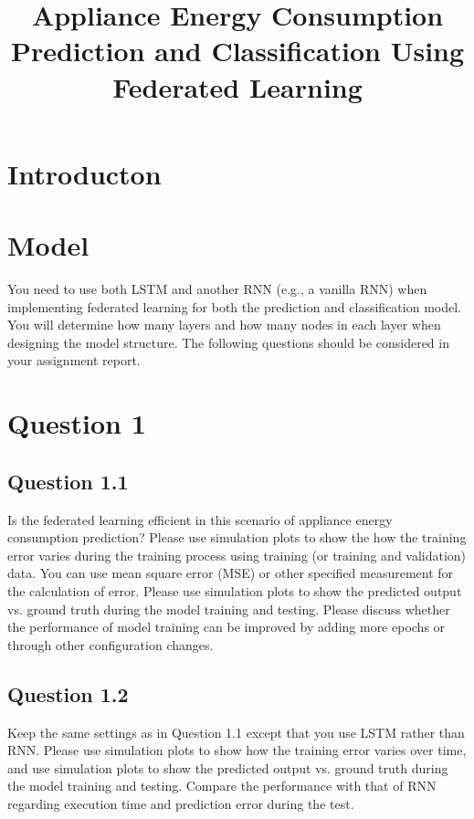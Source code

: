 \documentclass[a4paper, article, oneside, USenglish, IN5460]{memoir}
\title{Appliance Energy Consumption Prediction and Classification Using Federated Learning}
\begin{document}
\projectfrontpage


\chapter{Introducton}


\chapter{Model}

You need to use both LSTM and another RNN (e.g., a vanilla RNN) when implementing federated learning for both the prediction and classification model. You will determine how many layers and how many nodes in each layer when designing the model structure. The following questions should be considered in your assignment report.

\chapter{Question 1}



\section{Question 1.1}

Is the federated learning efficient in this scenario of appliance energy consumption prediction? Please use simulation plots to show the how the training error varies during the training process using training (or training and validation) data. You can use mean square error (MSE) or other specified measurement for the calculation of error. Please use simulation plots to show the predicted output vs. ground truth during the model training and testing. Please discuss whether the performance of model training can be improved by adding more epochs or through other configuration changes.


\section{Question 1.2}

Keep the same settings as in Question 1.1 except that you use LSTM rather than RNN. Please use simulation plots to show how the training error varies over time, and use simulation plots to show the predicted output vs. ground truth during the model training and testing. Compare the performance with that of RNN regarding execution time and prediction error during the test.
\end{document}
